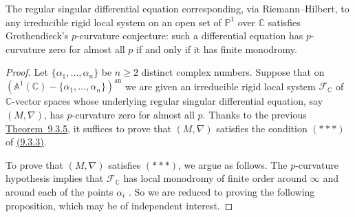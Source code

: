 The regular singular differential equation corresponding, via Riemann--Hilbert, to any irreducible rigid local system on an open set of \(\mathbb{P}^1\) over \(\mathbb{C}\) satisfies Grothendieck's \(p\)-curvature conjecture: such a differential equation has \(p\)-curvature zero for almost all \(p\) if and only if it has finite monodromy.
\begin{proof}
Let \(\{\alpha_1,\ldots,\alpha_n\}\) be \(n\geq2\) distinct complex numbers. Suppose that on \((\mathbb{A}^1(\mathbb{C})-\{\alpha_1,\ldots,\alpha_n\})^{\mathrm{an}}\) we are given an irreducible rigid local system \(\mathcal{F}_{\mathbb{C}}\) of \(\mathbb{C}\)-vector spaces whose underlying regular singular differential equation, say \((M,\nabla)\), has \(p\)-curvature zero for almost all \(p\). Thanks to the previous \hyperref[thm:9.3.5]{Theorem~9.3.5}, it suffices to prove that \((M,\nabla)\) satisfies the condition \((***)\) of \hyperref[par:9.3.3]{(9.3.3)}.

To prove that \((M,\nabla)\) satisfies \((***)\), we argue as follows. The \(p\)-curvature hypothesis implies that \(\mathcal{F}_{\mathbb{C}}\) has local monodromy of finite order around \(\infty\) and around each of the points \(\alpha_i\) \cite[13.0.2]{Ka-NCMT}. So we are reduced to proving the following proposition, which may be of independent interest.
\end{proof}

